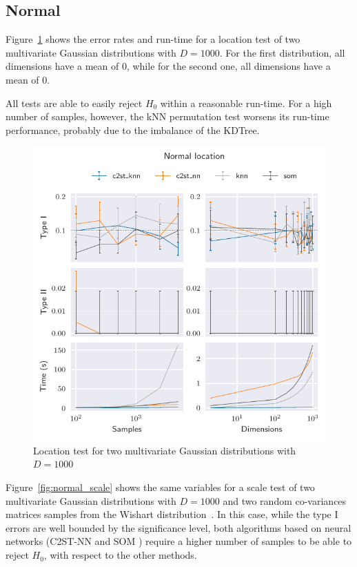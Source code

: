 \subsection{Normal}
Figure~\ref{fig:normal_location} shows the error rates and run-time for a location
test of two multivariate Gaussian distributions with $D=1000$. For the first distribution,
all dimensions have a mean of $0$, while for the second one, all dimensions have a mean of $0$.

All tests are able to easily reject $H_0$ within a reasonable run-time. For
a high number of samples, however, the kNN permutation test worsens its run-time performance,
probably due to the imbalance of the KDTree.

\begin{figure}[htpb]
    \centering
    \includegraphics{images/6_som/normal_location}
    \caption{
    Location test for two multivariate Gaussian distributions with $D=1000$
    }
    \label{fig:normal_location}
\end{figure}

Figure~\ref{fig:normal_scale} shows the same variables for a scale test of two multivariate
Gaussian distributions with $D=1000$ and two random co-variances matrices samples from the
Wishart distribution~\cite{smith1972algorithm}. In this case, while the type I errors are
well bounded by the significance level, both algorithms based on neural networks
(C2ST-NN and \gls{SOM} ) require a higher number of samples to be able to reject $H_0$, with respect
to the other methods.

